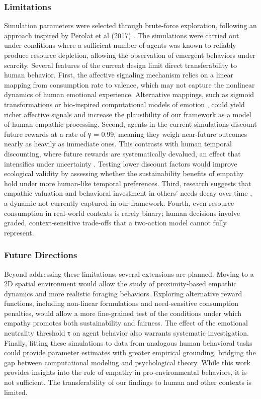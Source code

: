 \subsubsection{Limitations}
Simulation parameters were selected through brute-force exploration, following an approach inspired by Perolat et al (2017) \cite{perolatMultiagentReinforcementLearning2017}. The simulations were carried out under conditions where a sufficient number of agents was known to reliably produce resource depletion, allowing the observation of emergent behaviors under scarcity. 
Several features of the current design limit direct transferability to human behavior. First, the affective signaling mechanism relies on a linear mapping from consumption rate to valence, which may not capture the nonlinear dynamics of human emotional experience. Alternative mappings,  such as sigmoid transformations or bio-inspired computational models of emotion \cite{gannouniAdaptiveEmotionDetection2020,joffilyEmotionalValenceFreeenergy2013},  could yield richer affective signals and increase the plausibility of our framework as a model of human empathic processing. Second, agents in the current simulations discount future rewards at a rate of γ = 0.99, meaning they weigh near-future outcomes nearly as heavily as immediate ones. This contrasts with human temporal discounting, where future rewards are systematically devalued, an effect that intensifies under uncertainty \cite{storyDiscountingFutureReward2024}. Testing lower discount factors would improve ecological validity by assessing whether the sustainability benefits of empathy hold under more human-like temporal preferences. Third, research suggests that empathic valuation and behavioral investment in others' needs decay over time \cite{colemanIntertemporalEmpathyDecline2024}, a dynamic not currently captured in our framework. Fourth, even resource consumption in real-world contexts is rarely binary; human decisions involve graded, context-sensitive trade-offs that a two-action model cannot fully represent.

\subsubsection{Future Directions}
Beyond addressing these limitations, several extensions are planned. Moving to a 2D spatial environment would allow the study of proximity-based empathic dynamics and more realistic foraging behaviors. Exploring alternative reward functions, including non-linear formulations and need-sensitive consumption penalties, would allow a more fine-grained test of the conditions under which empathy promotes both sustainability and fairness. The effect of the emotional neutrality threshold τ on agent behavior also warrants systematic investigation. Finally, fitting these simulations to data from analogous human behavioral tasks could provide parameter estimates with greater empirical grounding, bridging the gap between computational modeling and psychological theory.
While this work provides insights into the role of empathy in pro-environmental behaviors, it is not sufficient. The transferability of our findings to human and other contexts is limited.




